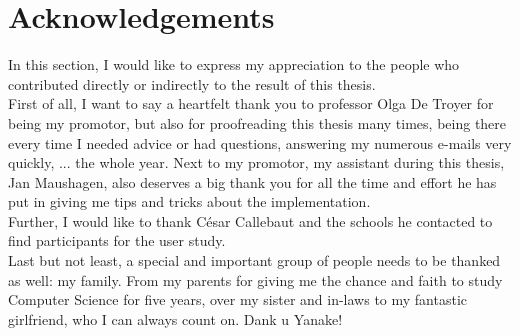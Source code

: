 \section*{Acknowledgements}\label{sec:acknowledgements}

In this section, I would like to express my appreciation to the people who contributed directly or indirectly to the result of this thesis.\\

First of all, I want to say a heartfelt thank you to professor Olga De Troyer for being my promotor, but also for proofreading this thesis many times, being there every time I needed advice or had questions, answering my numerous e-mails very quickly, ... the whole year. Next to my promotor, my assistant during this thesis, Jan Maushagen, also deserves a big thank you for all the time and effort he has put in giving me tips and tricks about the implementation.\\

Further, I would like to thank C\'esar Callebaut and the schools he contacted to find participants for the user study.\\

Last but not least, a special and important group of people needs to be thanked as well: my family. From my parents for giving me the chance and faith to study Computer Science for five years, over my sister and in-laws to my fantastic girlfriend, who I can always count on. Dank u Yanake!